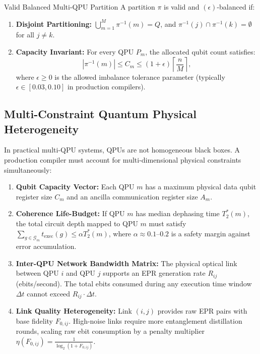 \begin{definitionbox}{Valid Balanced Multi-QPU Partition}
A partition $\pi$ is valid and $(\epsilon)$-balanced if:
\begin{enumerate}
    \item \textbf{Disjoint Partitioning:} $\bigcup_{m=1}^M \pi^{-1}(m) = Q$, and $\pi^{-1}(j) \cap \pi^{-1}(k) = \emptyset$ for all $j \neq k$.
    \item \textbf{Capacity Invariant:} For every QPU $P_m$, the allocated qubit count satisfies:
    \begin{equation}
        |\pi^{-1}(m)| \le C_m \le (1 + \epsilon) \left\lceil \frac{n}{M} \right\rceil,
        \label{eq:capacity_constraint_ch5}
    \end{equation}
    where $\epsilon \ge 0$ is the allowed imbalance tolerance parameter (typically $\epsilon \in [0.03, 0.10]$ in production compilers).
\end{enumerate}
\end{definitionbox}

\subsection{Multi-Constraint Quantum Physical Heterogeneity}
In practical multi-QPU systems, QPUs are not homogeneous black boxes. A production compiler must account for multi-dimensional physical constraints simultaneously:

\begin{enumerate}
    \item \textbf{Qubit Capacity Vector:} Each QPU $m$ has a maximum physical data qubit register size $C_m$ and an ancilla communication register size $A_m$.
    \item \textbf{Coherence Life-Budget:} If QPU $m$ has median dephasing time $T_2^*(m)$, the total circuit depth mapped to QPU $m$ must satisfy $\sum_{g \in \mathcal{G}_m} t_{\text{exec}}(g) \le \alpha T_2^*(m)$, where $\alpha \approx 0.1\text{--}0.2$ is a safety margin against error accumulation.
    \item \textbf{Inter-QPU Network Bandwidth Matrix:} The physical optical link between QPU $i$ and QPU $j$ supports an EPR generation rate $R_{ij}$ (ebits/second). The total ebits consumed during any execution time window $\Delta t$ cannot exceed $R_{ij} \cdot \Delta t$.
    \item \textbf{Link Quality Heterogeneity:} Link $(i, j)$ provides raw EPR pairs with base fidelity $F_{0, ij}$. High-noise links require more entanglement distillation rounds, scaling raw ebit consumption by a penalty multiplier $\eta(F_{0, ij}) = \frac{1}{\log_2(1 + F_{0, ij})}$.
\end{enumerate}

